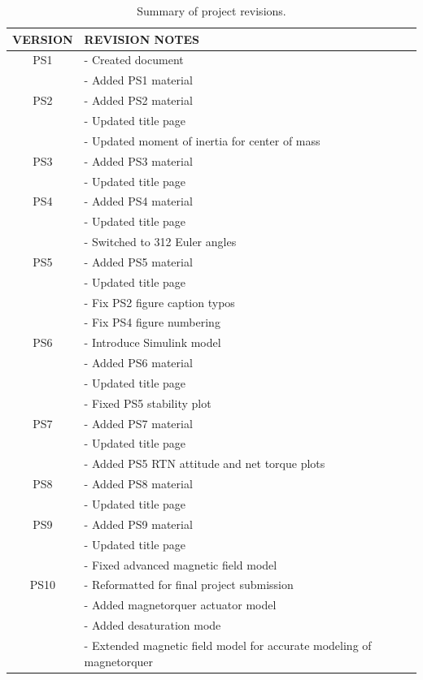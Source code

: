 \documentclass[12pt,a4paper,notitlepage]{article}
\begin{document}
\begin{table}[h!]
\begin{center}
\begin{tabular} [0.9 \textwidth]{cl}
\hline \hline
\multicolumn{1}{c}{VERSION} & \multicolumn{1}{l}{REVISION NOTES} \\
\hline
PS1 & - Created document \\
    & - Added PS1 material \\
\hline
PS2 & - Added PS2 material \\
    & - Updated title page \\
    & - Updated moment of inertia for center of mass \\
\hline
PS3 & - Added PS3 material \\
    & - Updated title page \\
\hline
PS4 & - Added PS4 material \\
    & - Updated title page \\
    & - Switched to 312 Euler angles \\
\hline
PS5 & - Added PS5 material \\
    & - Updated title page \\
    & - Fix PS2 figure caption typos \\
    & - Fix PS4 figure numbering \\
\hline
PS6 & - Introduce Simulink model \\
    & - Added PS6 material \\
    & - Updated title page \\
    & - Fixed PS5 stability plot \\
\hline
PS7 & - Added PS7 material \\
    & - Updated title page \\
    & - Added PS5 RTN attitude and net torque plots \\
\hline
PS8 & - Added PS8 material \\
    & - Updated title page \\
\hline
PS9 & - Added PS9 material \\
    & - Updated title page \\
    & - Fixed advanced magnetic field model \\
\hline
PS10 & - Reformatted for final project submission \\
    & - Added magnetorquer actuator model \\
    & - Added desaturation mode \\
    & - Extended magnetic field model for accurate modeling of magnetorquer \\
\hline \hline
\end{tabular}
	\caption{Summary of project revisions.}
\end{center}
\end{table}
 
\end{document}
